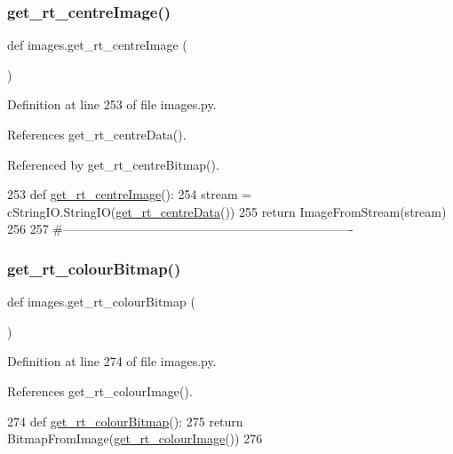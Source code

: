 \subsubsection{\texorpdfstring{get\+\_\+rt\+\_\+centre\+Image()}{get\_rt\_centreImage()}}
{\footnotesize\ttfamily def images.\+get\+\_\+rt\+\_\+centre\+Image (\begin{DoxyParamCaption}{ }\end{DoxyParamCaption})}



Definition at line 253 of file images.\+py.



References get\+\_\+rt\+\_\+centre\+Data().



Referenced by get\+\_\+rt\+\_\+centre\+Bitmap().


\begin{DoxyCode}
253 \textcolor{keyword}{def }\hyperlink{namespaceimages_ad0a504a5948c2d661187be424a907f77}{get\_rt\_centreImage}():
254     stream = cStringIO.StringIO(\hyperlink{namespaceimages_a80588d0b3c45479bb59dc2e48c1023f4}{get\_rt\_centreData}())
255     \textcolor{keywordflow}{return} ImageFromStream(stream)
256 
257 \textcolor{comment}{#----------------------------------------------------------------------}
\end{DoxyCode}
\mbox{\label{namespaceimages_a1b30859f9da34672b1a80b985153cec1}} 
\subsubsection{\texorpdfstring{get\+\_\+rt\+\_\+colour\+Bitmap()}{get\_rt\_colourBitmap()}}
{\footnotesize\ttfamily def images.\+get\+\_\+rt\+\_\+colour\+Bitmap (\begin{DoxyParamCaption}{ }\end{DoxyParamCaption})}



Definition at line 274 of file images.\+py.



References get\+\_\+rt\+\_\+colour\+Image().


\begin{DoxyCode}
274 \textcolor{keyword}{def }\hyperlink{namespaceimages_a1b30859f9da34672b1a80b985153cec1}{get\_rt\_colourBitmap}():
275     \textcolor{keywordflow}{return} BitmapFromImage(\hyperlink{namespaceimages_ab64671d6d1511c9f58621501f4a9c0eb}{get\_rt\_colourImage}())
276 
\end{DoxyCode}
\mbox{\label{namespaceimages_a8a0eb599a4907ce7cf32360e976a092f}} 

